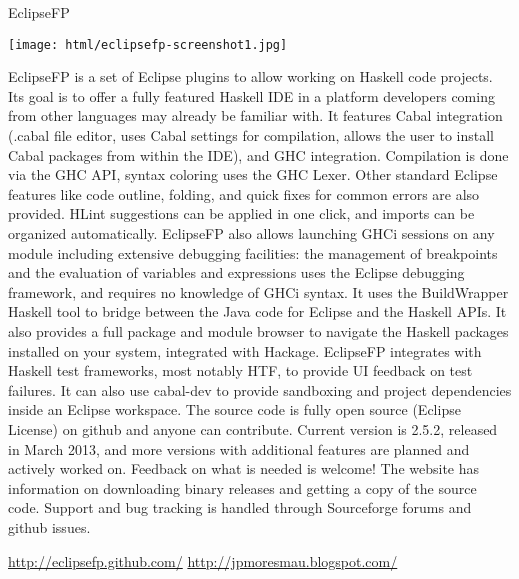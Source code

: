 \begin{hcarentry}[updated]{EclipseFP}
\makeheader

\begin{center}
\texttt{[image: html/eclipsefp-screenshot1.jpg]}
\end{center}

EclipseFP is a set of Eclipse plugins to allow working on Haskell code projects. Its goal is to offer a fully featured Haskell IDE in a platform developers coming from other languages may already be familiar with.
It features Cabal integration (.cabal file editor, uses Cabal settings for compilation, allows the user to install Cabal packages from within the IDE), and GHC integration. Compilation is done via the GHC API, syntax coloring uses the GHC Lexer. Other standard Eclipse features like code outline, folding, and quick fixes for common errors are also provided. HLint suggestions can be applied in one click, and imports can be organized automatically. EclipseFP also allows launching GHCi sessions on any module including extensive debugging facilities: the management of breakpoints and the evaluation of variables and expressions uses the Eclipse debugging framework, and requires no knowledge of GHCi syntax. It uses the BuildWrapper Haskell tool to bridge between the Java code for Eclipse and the Haskell APIs. It also provides a full package and module browser to navigate the Haskell packages installed on your system, integrated with Hackage.
EclipseFP integrates with Haskell test frameworks, most notably HTF, to provide UI feedback on test failures. It can also use cabal-dev to provide sandboxing and project dependencies inside an Eclipse workspace.
The source code is fully open source (Eclipse License) on github and anyone can contribute. Current version is 2.5.2, released in March 2013, and more versions with additional features are planned and actively worked on. Feedback on what is needed is welcome! The website has information on downloading binary releases and getting a copy of the source code. Support and bug tracking is handled through Sourceforge forums and github issues. 

\FurtherReading 
\url{http://eclipsefp.github.com/}
\url{http://jpmoresmau.blogspot.com/}
\end{hcarentry}
